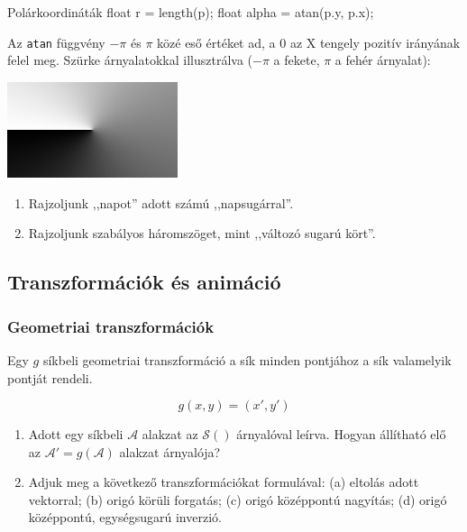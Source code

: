 \begin{glsl}{Polárkoordináták}
float r = length(p);
float alpha = atan(p.y, p.x);
\end{glsl}

Az \texttt{atan} függvény $-\pi$ és $\pi$ közé eső értéket ad, a 0 az X tengely pozitív irányának felel meg.
Szürke árnyalatokkal illusztrálva ($-\pi$ a fekete, $\pi$ a fehér árnyalat):

\includegraphics[width=5cm]{images/atan.png}

\progfeladatok

\begin{enumerate}
  \item Rajzoljunk ,,napot'' adott számú ,,napsugárral''.
  \item Rajzoljunk szabályos háromszöget, mint ,,változó sugarú kört''.
\end{enumerate}

\subsection{Transzformációk és animáció}

\subsubsection{Geometriai transzformációk}

Egy $g$ síkbeli geometriai transzformáció a sík minden pontjához a sík valamelyik pontját rendeli.

$$g(x, y) = (x', y')$$

\matfeladatok

\begin{enumerate}
  \item Adott egy síkbeli $\mathcal{A}$ alakzat az $\mathcal{S}()$ árnyalóval leírva. Hogyan állítható elő
  az $\mathcal{A}' = g(\mathcal{A})$ alakzat árnyalója?
  \item Adjuk meg a következő transzformációkat formulával:
  (a) eltolás adott vektorral;
  (b) origó körüli forgatás;
  (c) origó középpontú nagyítás;
  (d) origó középpontú, egységsugarú inverzió.
\end{enumerate}

